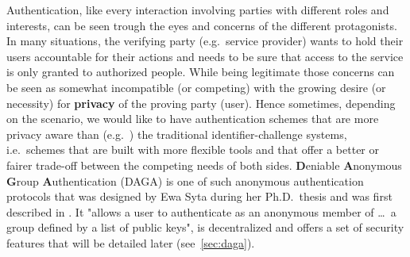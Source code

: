    Authentication, like every interaction involving parties with different roles and interests,
   can be seen trough the eyes and concerns of the different protagonists.
   In many situations, the verifying party (e.g.\ service provider) wants to hold their users accountable for their
   actions and needs to be sure that access to the service is only granted to authorized people.
   While being legitimate those concerns can be seen as somewhat incompatible (or competing) with the growing desire (or necessity) for \textbf{privacy}
   of the proving party (user).
   Hence sometimes, depending on the scenario, we would like to have authentication schemes that are more privacy aware
   than (e.g.\ ) the traditional identifier-challenge systems, i.e.\ schemes that are built with more flexible tools and
   that offer a better or fairer trade-off between the competing needs of both sides.
   \textbf{D}eniable \textbf{A}nonymous \textbf{G}roup \textbf{A}uthentication (DAGA)
   is one of such anonymous authentication protocols that was designed by Ewa Syta during her Ph.D.\ thesis
   and was first described in .
   It "allows a user to authenticate as an anonymous member of \ldots\ a group defined by a list of public keys"\cite{syta_identity_2015},
   is decentralized and offers a set of security features that will be detailed later (see~\ref{sec:daga}).


